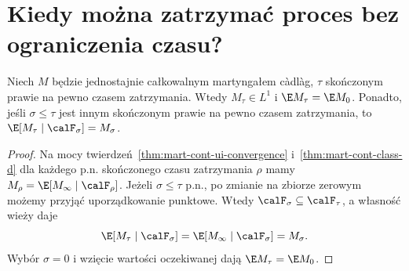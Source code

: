 \section{Kiedy można zatrzymać proces bez ograniczenia czasu?}
\begin{twierdzenie}
\label{thm:mart-cont-ui-ost}
Niech $M$ będzie jednostajnie całkowalnym martyngałem
c\`adl\`ag, $\tau$ skończonym prawie na pewno czasem
zatrzymania. Wtedy $M_\tau\in L^1$ i
$\E M_\tau=\E M_0$. Ponadto, jeśli $\sigma\le\tau$
jest innym skończonym prawie na pewno czasem zatrzymania,
to $\E[M_\tau\mid\calF_\sigma]=M_\sigma$.
\end{twierdzenie}
\begin{proof}
Na mocy twierdzeń~\ref{thm:mart-cont-ui-convergence}
i~\ref{thm:mart-cont-class-d} dla każdego p.n.
skończonego czasu zatrzymania $\rho$ mamy
$M_\rho=\E[M_\infty\mid\calF_\rho]$.
Jeżeli $\sigma\le\tau$ p.n., po zmianie na zbiorze
zerowym możemy przyjąć uporządkowanie punktowe.
Wtedy $\calF_\sigma\subseteq\calF_\tau$,
a własność wieży daje
\[
\E[M_\tau\mid\calF_\sigma]
=\E[M_\infty\mid\calF_\sigma]=M_\sigma.
\]
Wybór $\sigma=0$ i wzięcie wartości oczekiwanej
dają $\E M_\tau=\E M_0$.
\end{proof}

